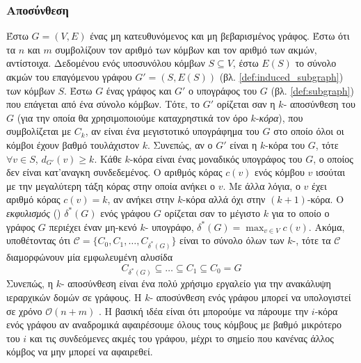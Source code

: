 \subsubsection{ Αποσύνθεση}
Έστω $G = (V,E)$ ένας μη κατευθυνόμενος και μη βεβαρισμένος γράφος.
Έστω ότι τα $n$ και $m$ συμβολίζουν τον αριθμό των κόμβων και τον αριθμό των ακμών, αντίστοιχα.
Δεδομένου ενός υποσυνόλου κόμβων $S \subseteq V$, έστω $E(S)$ το σύνολο ακμών του επαγόμενου γράφου $G'=(S,E(S))$  (βλ. \ref{def:induced_subgraph}) των κόμβων $S$.
Έστω $G$ ένας γράφος και $G'$ ο υπογράφος του $G$ (βλ. \ref{def:subgraph}) που επάγεται από ένα σύνολο κόμβων.
Τότε, το $G'$ ορίζεται σαν η $k$- αποσύνθεση του $G$ (για την οποία θα χρησιμοποιούμε καταχρηστικά τον όρο $k$-\textit{κόρα}), που συμβολίζεται με $C_k$, αν είναι ένα μεγιστοτικό υπογράφημα του $G$ στο οποίο όλοι οι κόμβοι έχουν βαθμό τουλάχιστον $k$.
Συνεπώς, αν ο $G'$ είναι η $k$-κόρα του $G$, τότε $\forall v \in S$, $d_{G'}(v) \geq k$.
Κάθε $k$-κόρα είναι ένας μοναδικός υπογράφος του $G$, ο οποίος δεν είναι κατ'αναγκη συνδεδεμένος.
Ο αριθμός κόρας $c(v)$ ενός κόμβου $v$ ισούται με την μεγαλύτερη τάξη κόρας στην οποία ανήκει ο $v$.
Με άλλα λόγια, ο $v$ έχει αριθμό κόρας $c(v) = k$, αν ανήκει στην $k$-κόρα αλλά όχι στην $(k+1)$-κόρα.
Ο \textit{εκφυλισμός} () $\delta^*(G)$ ενός γράφου $G$ ορίζεται σαν το μέγιστο $k$ για το οποίο ο γράφος $G$ περιέχει έναν μη-κενό $k$- υπογράφο, $\delta^*(G) = \max_{v \in V}c(v)$.
Ακόμα, υποθέτοντας ότι $\mathcal{C} = \{  C_0, C_1, \ldots, C_{\delta^*(G)} \}$ είναι το σύνολο όλων των $k$-, τότε τα $\mathcal{C}$ διαμορφώνουν μία εμφωλευμένη αλυσίδα
\begin{equation}
    C_{\delta^*(G)} \subseteq \ldots \subseteq C_1 \subseteq C_0 = G
\end{equation}
Συνεπώς, η $k$- αποσύνθεση είναι ένα πολύ χρήσιμο εργαλείο για την ανακάλυψη ιεραρχικών δομών σε γράφους.
Η $k$- αποσύνθεση ενός γράφου μπορεί να υπολογιστεί σε χρόνο $\mathcal{O}(n+m)$ \cite{matula1983smallest,batagelj2011fast}.
Η βασική ιδέα είναι ότι μπορούμε να πάρουμε την $i$-κόρα ενός γράφου αν αναδρομικά αφαιρέσουμε όλους τους κόμβους με βαθμό μικρότερο του $i$ και τις συνδεόμενες ακμές του γράφου, μέχρι το σημείο που κανένας άλλος κόμβος να μην μπορεί να αφαιρεθεί.
